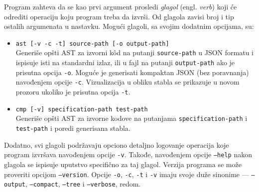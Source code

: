 Program zahteva da se kao prvi argument prosledi \emph{glagol} (engl. \emph{verb}) koji će odrediti operaciju koju program treba da izvrši. Od glagola zavisi broj i tip ostalih argumenata u nastavku. Mogući glagoli, sa svojim dodatnim opcijama, su:
\begin{itemize}
    \item \texttt{ast [-v -c -t] source-path [-o output-path]} \\
    Generiše opšti AST za izvorni k\^od na putanji \texttt{source-path} u JSON formatu i ispisuje isti na standardni izlaz, ili u fajl na putanji \texttt{output-path} ako je prisutna opcija \texttt{-o}. Moguće je generisati kompaktan JSON (bez poravnanja) navođenjem opcije \texttt{-c}. Vizualizacija u obliku stabla se prikazuje u novom prozoru ukoliko je prisutna opcija \texttt{-t}.
    \item \texttt{cmp [-v] specification-path test-path} \\
    Generiše opšti AST za izvorne kodove na putanjama \texttt{specification-path} i \texttt{test-path} i poredi generisana stabla. 
\end{itemize} 

Dodatno, svi glagoli podržavaju opciono detaljno logovanje operacija koje program izvršava navođenjem opcije \texttt{-v}. Takođe, navođenjem opcije \texttt{--help} nakon glagola se ispisuje uputstvo specifično za taj glagol. Verzija programa se može proveriti opcijom \texttt{--version}. Opcije \texttt{-o}, \texttt{-c}, \texttt{-t} i \texttt{-v} imaju svoje duže sinonime --- \texttt{--output}, \texttt{--compact}, \texttt{--tree} i \texttt{--verbose}, redom.

